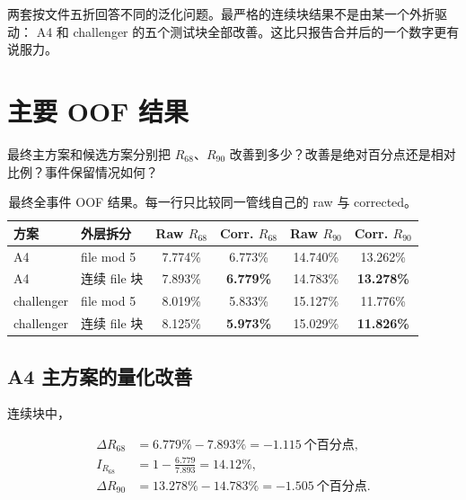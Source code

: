 \documentclass[UTF8,12pt,a4paper,oneside,fontset=none]{ctexart}
\numberwithin{equation}{section}
\newcommand{\Rsixtyeight}{R_{68}}
\newcommand{\Rninety}{R_{90}}
\begin{document}
\begin{conclusionbox}
两套按文件五折回答不同的泛化问题。最严格的连续块结果不是由某一个外折驱动：
A4 和 challenger 的五个测试块全部改善。这比只报告合并后的一个数字更有说服力。
\end{conclusionbox}

\section{主要 OOF 结果}
\label{sec:main-results}

\begin{questionbox}
最终主方案和候选方案分别把 \(\Rsixtyeight\)、\(\Rninety\) 改善到多少？改善是绝对百分点还是相对比例？事件保留情况如何？
\end{questionbox}

\begin{table}[H]
\centering
\caption{最终全事件 OOF 结果。每一行只比较同一管线自己的 raw 与 corrected。}
\label{tab:main-results}
\begin{tabular}{llcccc}
\toprule
方案 & 外层拆分 & Raw \(\Rsixtyeight\) & Corr. \(\Rsixtyeight\) & Raw \(\Rninety\) & Corr. \(\Rninety\) \\
\midrule
A4 & file mod 5 & 7.774\% & 6.773\% & 14.740\% & 13.262\% \\
\rowcolor{SoftTeal}
A4 & 连续 file 块 & 7.893\% & \textbf{6.779\%} & 14.783\% & \textbf{13.278\%} \\
challenger & file mod 5 & 8.019\% & 5.833\% & 15.127\% & 11.776\% \\
\rowcolor{SoftGold}
challenger & 连续 file 块 & 8.125\% & \textbf{5.973\%} & 15.029\% & \textbf{11.826\%} \\
\bottomrule
\end{tabular}
\end{table}

\subsection{A4 主方案的量化改善}

连续块中，

\begin{align}
\Delta\Rsixtyeight
&=6.779\%-7.893\%=-1.115\ \text{个百分点},
\label{eq:a4-delta-r68}\\
I_{R_{68}}
&=1-\frac{6.779}{7.893}=14.12\%,
\label{eq:a4-relative-r68}\\
\Delta\Rninety
&=13.278\%-14.783\%=-1.505\ \text{个百分点}.
\label{eq:a4-delta-r90}
\end{align}
\end{document}
